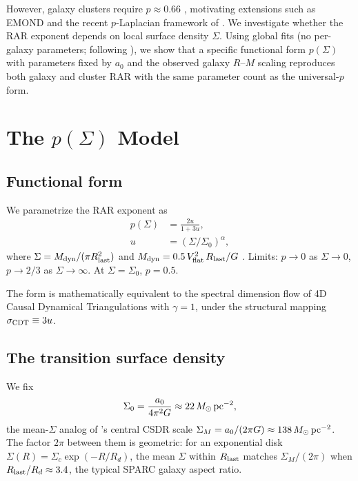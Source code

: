 \documentclass[twocolumn]{aastex631}
\begin{document}
However, galaxy clusters require $p \approx 0.66$ \citep{Sanders2003,
Famaey2012}, motivating extensions such as EMOND \citep{ZhaoFamaey2012}
and the recent $p$-Laplacian framework of \citet{Scherer2025}. We
investigate whether the RAR exponent depends on local surface density
$\Sigma$. Using global fits (no per-galaxy parameters; following
\citealt{Li2021}), we show that a specific functional form $p(\Sigma)$
with parameters fixed by $a_0$ and the observed galaxy $R$--$M$ scaling
reproduces both galaxy and cluster RAR with the same parameter count
as the universal-$p$ form.

\section{The $p(\Sigma)$ Model}

\subsection{Functional form}

We parametrize the RAR exponent as
\begin{align}
p(\Sigma) &= \frac{2u}{1 + 3u}, \\
u &= (\Sigma/\Sigma_0)^\alpha,
\end{align}
where $\Sigma = M_{\rm dyn}/(\pi R_{\rm last}^2)$ and
$M_{\rm dyn} = 0.5\,V_{\rm flat}^2\,R_{\rm last}/G$ \citep{Lelli2017}.
Limits: $p \to 0$ as $\Sigma \to 0$, $p \to 2/3$ as $\Sigma \to \infty$.
At $\Sigma = \Sigma_0$, $p = 0.5$.

The form is mathematically equivalent to the spectral dimension flow
of 4D Causal Dynamical Triangulations \citep{Ambjorn2005} with
$\gamma = 1$, under the structural mapping $\sigma_{\rm CDT} \equiv 3u$.

\subsection{The transition surface density}

We fix
\begin{equation}
\Sigma_0 = \frac{a_0}{4\pi^2 G} \approx 22\,M_\odot\,{\rm pc}^{-2},
\label{eq:sigma0}
\end{equation}
the mean-$\Sigma$ analog of \citet{Milgrom2016}'s central CSDR scale
$\Sigma_M = a_0/(2\pi G) \approx 138\,M_\odot\,{\rm pc}^{-2}$. The
factor $2\pi$ between them is geometric: for an exponential disk
$\Sigma(R) = \Sigma_c \exp(-R/R_d)$, the mean $\Sigma$ within
$R_{\rm last}$ matches $\Sigma_M/(2\pi)$ when $R_{\rm last}/R_d
\approx 3.4$, the typical SPARC galaxy aspect ratio.
\end{document}
